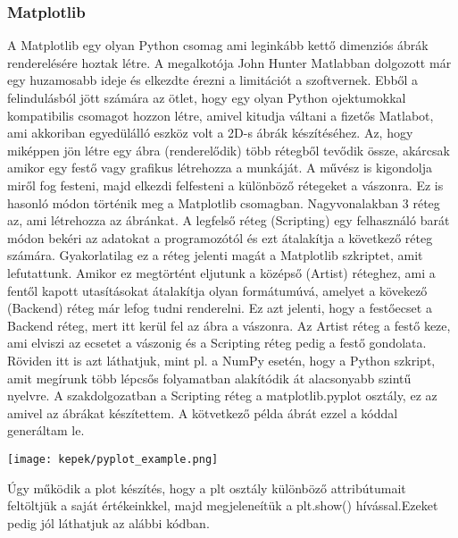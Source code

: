 \documentclass{article}
\theoremstyle{definition}
\theoremstyle{theorem}
\begin{document}
\subsubsection{Matplotlib}
A Matplotlib egy olyan Python csomag ami leginkább kettő dimenziós ábrák renderelésére hoztak létre. A megalkotója John Hunter Matlabban dolgozott már egy huzamosabb ideje és elkezdte érezni a limitációt a szoftvernek. Ebből a felindulásból jött számára az ötlet, hogy egy olyan Python ojektumokkal kompatibilis csomagot hozzon létre, amivel kitudja váltani a fizetős Matlabot, ami akkoriban egyedülálló eszköz volt a 2D-s ábrák készítéséhez. Az, hogy miképpen jön létre egy ábra (renderelődik) több rétegből tevődik össze, akárcsak amikor egy festő vagy grafikus létrehozza a munkáját. A művész is kigondolja miről fog festeni, majd elkezdi felfesteni a különböző rétegeket a vászonra. Ez is hasonló módon történik meg a Matplotlib csomagban. Nagyvonalakban 3 réteg az, ami létrehozza az ábránkat. A legfelső réteg (Scripting) egy felhasználó barát módon bekéri az adatokat a programozótól és ezt átalakítja a következő réteg számára. Gyakorlatilag ez a réteg jelenti magát a Matplotlib szkriptet, amit lefutattunk. Amikor ez megtörtént eljutunk a középső (Artist) réteghez, ami a fentől kapott utasításokat átalakítja olyan formátumúvá, amelyet a kövekező (Backend) réteg már lefog tudni renderelni. Ez azt jelenti, hogy a festőecset a Backend réteg, mert itt kerül fel az ábra a vászonra. Az Artist réteg a festő keze, ami elviszi az ecsetet a vászonig és a Scripting réteg pedig a festő gondolata. Röviden itt is azt láthatjuk, mint pl. a NumPy esetén, hogy a Python szkript, amit megírunk több lépcsős folyamatban alakítódik át alacsonyabb szintű nyelvre.\newline
A szakdolgozatban a Scripting réteg a matplotlib.pyplot osztály, ez az amivel az ábrákat készítettem.
A kötvetkező példa ábrát ezzel a kóddal generáltam le.
\begin{center}
\texttt{[image: kepek/pyplot\_example.png]}
\end{center}
Úgy működik a plot készítés, hogy a plt osztály különböző attribútumait feltöltjük a saját értékeinkkel, majd megjeleneítük a plt.show() hívással.Ezeket pedig jól láthatjuk az alábbi kódban.
\pagebreak

\end{document}
